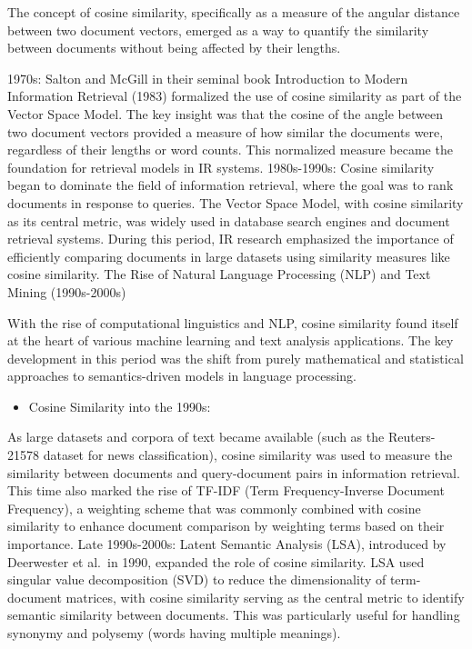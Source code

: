 \documentclass[
  12 pt,
  a4paper,
]{book}
\providecommand{\tightlist}{%
  \setlength{\itemsep}{0pt}\setlength{\parskip}{0pt}}
\numberwithin{equation}{section}
\theoremstyle{plain}      %
\theoremstyle{definition} %
\theoremstyle{remark}     %
\theoremstyle{note}         %
\begin{document}
The concept of cosine similarity, specifically as a measure of the
angular distance between two document vectors, emerged as a way to
quantify the similarity between documents without being affected by
their lengths.

1970s: Salton and McGill in their seminal book Introduction to Modern
Information Retrieval (1983) formalized the use of cosine similarity as
part of the Vector Space Model. The key insight was that the cosine of
the angle between two document vectors provided a measure of how similar
the documents were, regardless of their lengths or word counts. This
normalized measure became the foundation for retrieval models in IR
systems. 1980s-1990s: Cosine similarity began to dominate the field of
information retrieval, where the goal was to rank documents in response
to queries. The Vector Space Model, with cosine similarity as its
central metric, was widely used in database search engines and document
retrieval systems. During this period, IR research emphasized the
importance of efficiently comparing documents in large datasets using
similarity measures like cosine similarity. The Rise of Natural Language
Processing (NLP) and Text Mining (1990s-2000s)

With the rise of computational linguistics and NLP, cosine similarity
found itself at the heart of various machine learning and text analysis
applications. The key development in this period was the shift from
purely mathematical and statistical approaches to semantics-driven
models in language processing.

\begin{itemize}
\tightlist
\item
  Cosine Similarity into the 1990s:
\end{itemize}

As large datasets and corpora of text became available (such as the
Reuters-21578 dataset for news classification), cosine similarity was
used to measure the similarity between documents and query-document
pairs in information retrieval. This time also marked the rise of TF-IDF
(Term Frequency-Inverse Document Frequency), a weighting scheme that was
commonly combined with cosine similarity to enhance document comparison
by weighting terms based on their importance. Late 1990s-2000s: Latent
Semantic Analysis (LSA), introduced by Deerwester et al.~in 1990,
expanded the role of cosine similarity. LSA used singular value
decomposition (SVD) to reduce the dimensionality of term-document
matrices, with cosine similarity serving as the central metric to
identify semantic similarity between documents. This was particularly
useful for handling synonymy and polysemy (words having multiple
meanings).
\end{document}
